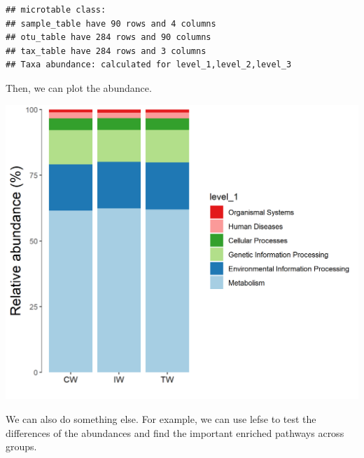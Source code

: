 \documentclass[
]{book}
\newenvironment{Shaded}{\begin{snugshade}}{\end{snugshade}}
\newcommand{\AttributeTok}[1]{\textcolor[rgb]{0.77,0.63,0.00}{#1}}
\newcommand{\CommentTok}[1]{\textcolor[rgb]{0.56,0.35,0.01}{\textit{#1}}}
\newcommand{\ConstantTok}[1]{\textcolor[rgb]{0.00,0.00,0.00}{#1}}
\newcommand{\DecValTok}[1]{\textcolor[rgb]{0.00,0.00,0.81}{#1}}
\newcommand{\FloatTok}[1]{\textcolor[rgb]{0.00,0.00,0.81}{#1}}
\newcommand{\FunctionTok}[1]{\textcolor[rgb]{0.00,0.00,0.00}{#1}}
\newcommand{\NormalTok}[1]{#1}
\newcommand{\OtherTok}[1]{\textcolor[rgb]{0.56,0.35,0.01}{#1}}
\newcommand{\SpecialCharTok}[1]{\textcolor[rgb]{0.00,0.00,0.00}{#1}}
\newcommand{\StringTok}[1]{\textcolor[rgb]{0.31,0.60,0.02}{#1}}
\begin{document}
\begin{verbatim}
## microtable class:
## sample_table have 90 rows and 4 columns
## otu_table have 284 rows and 90 columns
## tax_table have 284 rows and 3 columns
## Taxa abundance: calculated for level_1,level_2,level_3
\end{verbatim}

Then, we can plot the abundance.

\begin{Shaded}
\end{Shaded}

\begin{center}\includegraphics[width=600px]{Images/plot_bar_tax4fun1} \end{center}

We can also do something else. For example, we can use lefse to test the differences of the abundances and find the important enriched pathways across groups.

\begin{Shaded}
\end{Shaded}
\end{document}
